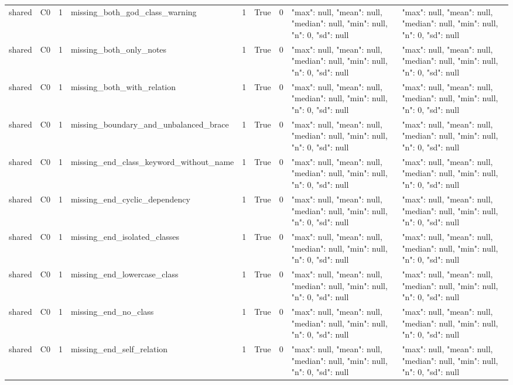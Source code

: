\begin{tabular}{lllllllll}
shared & C0 & 1 & missing\_both\_god\_class\_warning & 1 & True & 0 & {"max": null, "mean": null, "median": null, "min": null, "n": 0, "sd": null} & {"max": null, "mean": null, "median": null, "min": null, "n": 0, "sd": null} \\
shared & C0 & 1 & missing\_both\_only\_notes & 1 & True & 0 & {"max": null, "mean": null, "median": null, "min": null, "n": 0, "sd": null} & {"max": null, "mean": null, "median": null, "min": null, "n": 0, "sd": null} \\
shared & C0 & 1 & missing\_both\_with\_relation & 1 & True & 0 & {"max": null, "mean": null, "median": null, "min": null, "n": 0, "sd": null} & {"max": null, "mean": null, "median": null, "min": null, "n": 0, "sd": null} \\
shared & C0 & 1 & missing\_boundary\_and\_unbalanced\_brace & 1 & True & 0 & {"max": null, "mean": null, "median": null, "min": null, "n": 0, "sd": null} & {"max": null, "mean": null, "median": null, "min": null, "n": 0, "sd": null} \\
shared & C0 & 1 & missing\_end\_class\_keyword\_without\_name & 1 & True & 0 & {"max": null, "mean": null, "median": null, "min": null, "n": 0, "sd": null} & {"max": null, "mean": null, "median": null, "min": null, "n": 0, "sd": null} \\
shared & C0 & 1 & missing\_end\_cyclic\_dependency & 1 & True & 0 & {"max": null, "mean": null, "median": null, "min": null, "n": 0, "sd": null} & {"max": null, "mean": null, "median": null, "min": null, "n": 0, "sd": null} \\
shared & C0 & 1 & missing\_end\_isolated\_classes & 1 & True & 0 & {"max": null, "mean": null, "median": null, "min": null, "n": 0, "sd": null} & {"max": null, "mean": null, "median": null, "min": null, "n": 0, "sd": null} \\
shared & C0 & 1 & missing\_end\_lowercase\_class & 1 & True & 0 & {"max": null, "mean": null, "median": null, "min": null, "n": 0, "sd": null} & {"max": null, "mean": null, "median": null, "min": null, "n": 0, "sd": null} \\
shared & C0 & 1 & missing\_end\_no\_class & 1 & True & 0 & {"max": null, "mean": null, "median": null, "min": null, "n": 0, "sd": null} & {"max": null, "mean": null, "median": null, "min": null, "n": 0, "sd": null} \\
shared & C0 & 1 & missing\_end\_self\_relation & 1 & True & 0 & {"max": null, "mean": null, "median": null, "min": null, "n": 0, "sd": null} & {"max": null, "mean": null, "median": null, "min": null, "n": 0, "sd": null} \\

\end{tabular}
